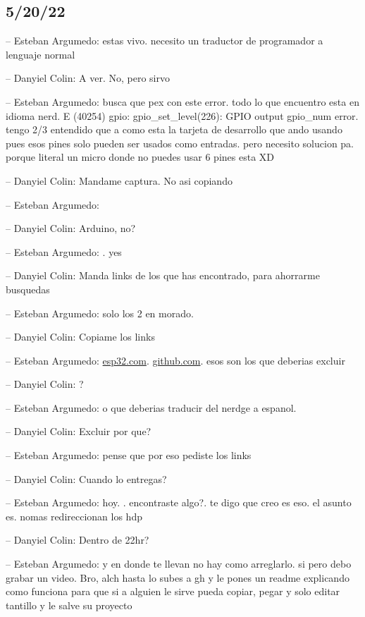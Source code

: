 \hypertarget{section-81}{%
\subsection{5/20/22}\label{section-81}}

-- Esteban Argumedo: estas vivo. necesito un traductor de programador a
lenguaje normal

-- Danyiel Colin: A ver. No, pero sirvo

-- Esteban Argumedo: busca que pex con este error. todo lo que encuentro
esta en idioma nerd. E (40254) gpio: gpio\_set\_level(226): GPIO output
gpio\_num error. tengo 2/3 entendido que a como esta la tarjeta de
desarrollo que ando usando pues esos pines solo pueden ser usados como
entradas. pero necesito solucion pa. porque literal un micro donde no
puedes usar 6 pines esta XD

-- Danyiel Colin: Mandame captura. No asi copiando

-- Esteban Argumedo:

-- Danyiel Colin: Arduino, no?

-- Esteban Argumedo: . yes

-- Danyiel Colin: Manda links de los que has encontrado, para ahorrarme
busquedas

-- Esteban Argumedo: solo los 2 en morado.

-- Danyiel Colin: Copiame los links

-- Esteban Argumedo:
\href{https://esp32.com/viewtopic.php?t=7928}{esp32.com}.
\href{https://github.com/espressif/esp-idf/issues/2133}{github.com}.
esos son los que deberias excluir

-- Danyiel Colin: ?

-- Esteban Argumedo: o que deberias traducir del nerdge a espanol.

-- Danyiel Colin: Excluir por que?

-- Esteban Argumedo: pense que por eso pediste los links

-- Danyiel Colin: Cuando lo entregas?

-- Esteban Argumedo: hoy. . encontraste algo?. te digo que creo es eso.
el asunto es. nomas redireccionan los hdp

-- Danyiel Colin: Dentro de 22hr?

-- Esteban Argumedo: y en donde te llevan no hay como arreglarlo. si
pero debo grabar un video. Bro, alch hasta lo subes a gh y le pones un
readme explicando como funciona para que si a alguien le sirve pueda
copiar, pegar y solo editar tantillo y le salve su proyecto


